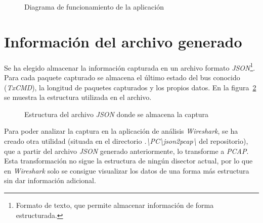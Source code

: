 \begin{enumerate}
    \begin{figure}[hbtp]
        \centering
        \scalebox{0.8} {}
        \caption{Diagrama de funcionamiento de la aplicación}
        \label{fig:flujo_app}
    \end{figure}
    
\end{enumerate}


\section{Información del archivo generado}
Se ha elegido almacenar la información capturada en un archivo formato \emph{JSON}\footnote{Formato de texto, que permite almacenar información de forma estructurada.}. Para cada paquete capturado se almacena el último estado del bus conocido (\emph{TxCMD}), la longitud de paquetes capturados y los propios datos. En la figura~\ref{fig:tree-json} se muestra la estructura utilizada en el archivo.

\begin{figure}[!hbtp]
    \centering
    \begin{minipage}{6cm}
    \end{minipage}
    \caption{Estructura del archivo \emph{JSON} donde se almacena la captura}
    \label{fig:tree-json}
\end{figure}

Para poder analizar la captura en la aplicación de análisis \emph{Wireshark}, se ha creado otra utilidad (situada en el directorio \emph{.\textbackslash PC\textbackslash json2pcap\textbackslash} del repositorio), que a partir del archivo \emph{JSON} generado anteriormente, lo transforme a \emph{PCAP}. Esta transformación no sigue la estructura de ningún disector\cite{wiresharkdisector2014} actual, por lo que en \emph{Wireshark} solo se consigue visualizar los datos de una forma más estructura sin dar información adicional.




